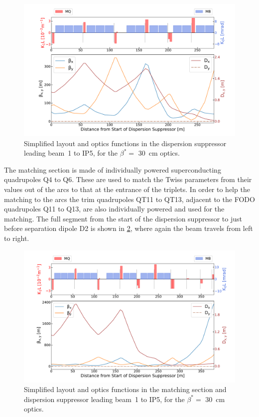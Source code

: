 \begin{figure}[!hbt]
  \centering
  \includegraphics*[width=0.99\linewidth]{Figures/Optics_Measurements_Corrections_at_LHC/lhc_dispersion_suppressor.pdf}
  \caption{Simplified layout and optics functions in the dispersion suppressor leading beam~\num{1} to IP\num{5}, for the \(\beta^{\ast} =\) \qty{30}{\centi\meter} optics.}
  \label{figure:lhc_dispersion_suppressor}
\end{figure}

The matching section is made of individually powered superconducting quadrupoles Q\num{4} to Q\num{6}.
These are used to match the Twiss parameters from their values out of the arcs to that at the entrance of the triplets.
In order to help the matching to the arcs the trim quadrupoles QT\num{11} to QT\num{13}, adjacent to the FODO quadrupoles Q\num{11} to Q\num{13}, are also individually powered and used for the matching.
The full segment from the start of the dispersion suppressor to just before separation dipole D\num{2} is shown in \cref{figure:lhc_matching_section}, where again the beam travels from left to right.

\begin{figure}[!hbt]
  \centering
  \includegraphics*[width=0.99\linewidth]{Figures/Optics_Measurements_Corrections_at_LHC/lhc_matching_section.pdf}
  \caption{Simplified layout and optics functions in the matching section and dispersion suppressor leading beam~\num{1} to IP\num{5}, for the \(\beta^{\ast} =\) \qty{30}{\centi\meter} optics.}
  \label{figure:lhc_matching_section}
\end{figure}

